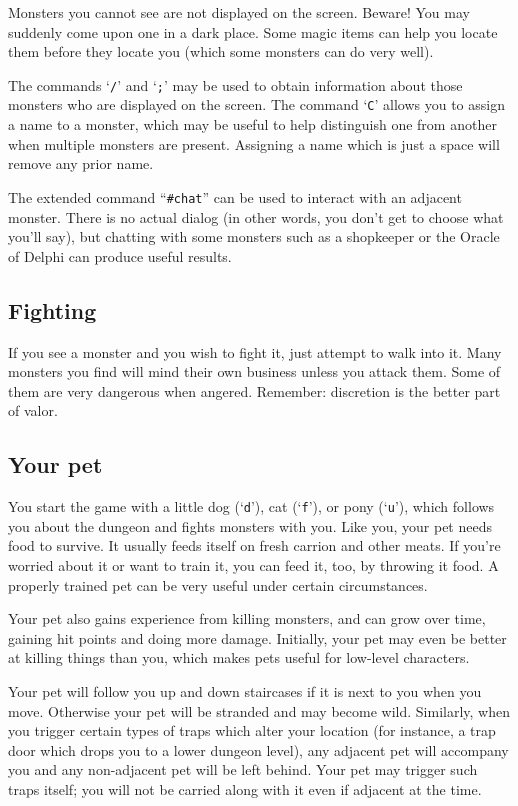 Monsters you cannot see are not displayed on the screen.  Beware!
You may suddenly come upon one in a dark place.  Some magic items can
help you locate them before they locate you (which some monsters can do
very well).

The commands `{\tt /}' and `{\tt ;}' may be used to obtain information
about those
monsters who are displayed on the screen.  The command `{\tt C}' allows you
to assign a name to a monster, which may be useful to help distinguish
one from another when multiple monsters are present.  Assigning a name
which is just a space will remove any prior name.

The extended command ``{\tt \#chat}'' can be used to interact with an adjacent
monster.  There is no actual dialog (in other words, you don't get to
choose what you'll say), but chatting with some monsters such as a
shopkeeper or the Oracle of Delphi can produce useful results.

\subsection*{Fighting}

If you see a monster and you wish to fight it, just attempt to walk
into it.  Many monsters you find will mind their own business unless
you attack them.  Some of them are very dangerous when angered.
Remember:  discretion is the better part of valor.

\subsection*{Your pet}

You start the game with a little dog (`{\tt d}'), cat (`{\tt f}'),
or pony (`{\tt u}'), which follows
you about the dungeon and fights monsters with you.  Like you, your
pet needs food to survive.  It usually feeds itself on fresh carrion
and other meats.  If you're worried about it or want to train it, you
can feed it, too, by throwing it food.  A properly trained pet can be
very useful under certain circumstances.

Your pet also gains experience from killing monsters, and can grow
over time, gaining hit points and doing more damage.  Initially, your
pet may even be better at killing things than you, which makes pets
useful for low-level characters.

Your pet will follow you up and down staircases if it is next to you
when you move.  Otherwise your pet will be stranded and may become
wild.  Similarly, when you trigger certain types of traps which alter
your location (for instance, a trap door which drops you to a lower
dungeon level), any adjacent pet will accompany you and any non-adjacent
pet will be left behind.  Your pet may trigger such traps itself; you
will not be carried along with it even if adjacent at the time.


